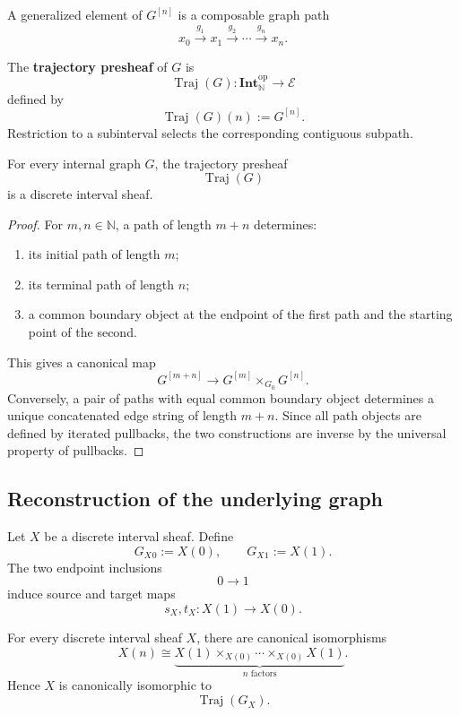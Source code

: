 A generalized element of \(G^{[n]}\) is a composable graph path
\[
    x_0\xrightarrow{g_1}x_1
    \xrightarrow{g_2}\cdots
    \xrightarrow{g_n}x_n.
\]

\begin{definition}
\label{def:trajectory-presheaf-internal-graph}
The \textbf{trajectory presheaf} of \(G\) is
\[
    \operatorname{Traj}(G):
    \mathbf{Int}_{\mathbb N}^{\mathrm{op}}\to\mathcal E
\]
defined by
\[
    \operatorname{Traj}(G)(n):=G^{[n]}.
\]
Restriction to a subinterval selects the corresponding contiguous subpath.
\end{definition}

\begin{theorem}
\label{thm:temporal-gluing-graph-trajectories}
For every internal graph \(G\), the trajectory presheaf
\[
    \operatorname{Traj}(G)
\]
is a discrete interval sheaf.
\end{theorem}

\begin{proof}
For \(m,n\in\mathbb N\), a path of length \(m+n\) determines:
\begin{enumerate}
    \item its initial path of length \(m\);
    \item its terminal path of length \(n\);
    \item a common boundary object at the endpoint of the first path and the
    starting point of the second.
\end{enumerate}
This gives a canonical map
\[
    G^{[m+n]}
    \longrightarrow
    G^{[m]}\times_{G_0}G^{[n]}.
\]
Conversely, a pair of paths with equal common boundary object determines a
unique concatenated edge string of length \(m+n\). Since all path objects are
defined by iterated pullbacks, the two constructions are inverse by the
universal property of pullbacks.
\end{proof}

\subsection{Reconstruction of the underlying graph}
\label{subsec:reconstruction-underlying-graph}

Let \(X\) be a discrete interval sheaf. Define
\[
    G_X{}_0:=X(0),
    \qquad
    G_X{}_1:=X(1).
\]
The two endpoint inclusions
\[
    0\to 1
\]
induce source and target maps
\[
    s_X,t_X:X(1)\to X(0).
\]

\begin{proposition}
\label{prop:reconstruction-length-zero-one}
For every discrete interval sheaf \(X\), there are canonical isomorphisms
\[
    X(n)
    \cong
    \underbrace{
    X(1)\times_{X(0)}\cdots\times_{X(0)}X(1)
    }_{n\text{ factors}}.
\]
Hence \(X\) is canonically isomorphic to
\[
    \operatorname{Traj}(G_X).
\]
\end{proposition}

